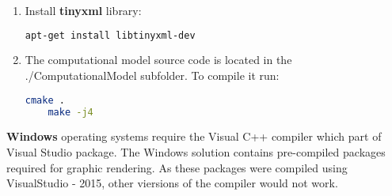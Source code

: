 \documentclass[11]{article}
\begin{document}
\begin{enumerate}
  \item Install \textbf{tinyxml} library:
    \begin{lstlisting}[language=bash]
    apt-get install libtinyxml-dev
    \end{lstlisting}
    
  \item The computational model source code is located in the ./ComputationalModel subfolder. To compile it run:
    \begin{lstlisting}[language=bash]
    cmake .
    make -j4
    \end{lstlisting}
\end{enumerate}

\textbf{Windows} operating systems require the Visual C++ compiler which part of Visual Studio package.
The Windows solution contains pre-compiled packages required for graphic rendering. 
As these packages were compiled using VisualStudio - 2015, other viersions of the compiler would not work.   
\end{document}
